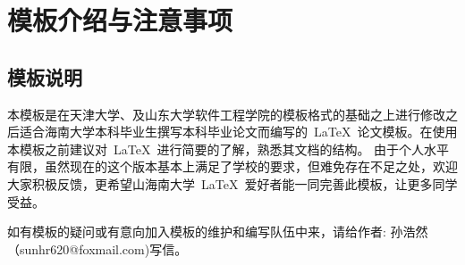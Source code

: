 
\chapter{模板介绍与注意事项}

\section{模板说明}

本模板是在天津大学、及山东大学软件工程学院的模板格式的基础之上进行修改之后适合海南大学本科毕业生撰写本科毕业论文而编写的~\LaTeX~论文模板。在使用本模板之前建议对~\LaTeX~进行简要的了解，熟悉其文档的结构。
由于个人水平有限，虽然现在的这个版本基本上满足了学校的要求，但难免存在不足之处，欢迎大家积极反馈，更希望山海南大学~\LaTeX~爱好者能一同完善此模板，让更多同学受益。

如有模板的疑问或有意向加入模板的维护和编写队伍中来，请给作者: 孙浩然（sunhr620@foxmail.com)写信。

